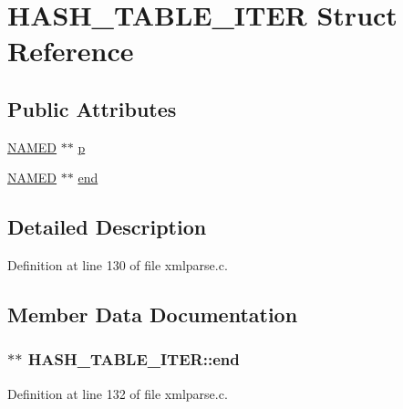 \hypertarget{struct_h_a_s_h___t_a_b_l_e___i_t_e_r}{}\section{H\+A\+S\+H\+\_\+\+T\+A\+B\+L\+E\+\_\+\+I\+T\+ER Struct Reference}
\label{struct_h_a_s_h___t_a_b_l_e___i_t_e_r}
\subsection*{Public Attributes}
\begin{DoxyCompactItemize}
\item 
\hyperlink{struct_n_a_m_e_d}{N\+A\+M\+ED} $\ast$$\ast$ \hyperlink{struct_h_a_s_h___t_a_b_l_e___i_t_e_r_a7d68e32e21c52fb62f27b9de92f5dafe}{p}
\item 
\hyperlink{struct_n_a_m_e_d}{N\+A\+M\+ED} $\ast$$\ast$ \hyperlink{struct_h_a_s_h___t_a_b_l_e___i_t_e_r_a9709a401b35a2cc6472828ce0b1e5d03}{end}
\end{DoxyCompactItemize}


\subsection{Detailed Description}


Definition at line 130 of file xmlparse.\+c.



\subsection{Member Data Documentation}
\subsubsection[{\texorpdfstring{end}{end}}]{$\ast$$\ast$ H\+A\+S\+H\+\_\+\+T\+A\+B\+L\+E\+\_\+\+I\+T\+E\+R\+::end}\hypertarget{struct_h_a_s_h___t_a_b_l_e___i_t_e_r_a9709a401b35a2cc6472828ce0b1e5d03}{}\label{struct_h_a_s_h___t_a_b_l_e___i_t_e_r_a9709a401b35a2cc6472828ce0b1e5d03}


Definition at line 132 of file xmlparse.\+c.

